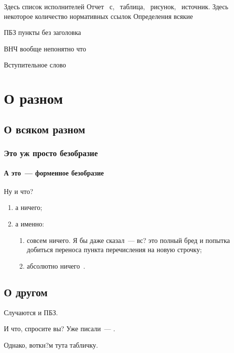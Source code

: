 \documentclass[utf8,usehyperref]{G7-32}
\begin{document}
\frontmatter
 \Executors Здесь список исполнителей
 \Referat
 Отчет \totalpages~с, \totaltables~таблица, \totalfigures~рисунок, \totalbibs~источник.
 \tableofcontents
 \NormRefs Здесь некоторое количество нормативных ссылок
 \Defines Определения всякие
 \Abbreviations
 \begin{abbreviation}
  \item[ПБЗ] пункты без заголовка
  \item[ВНЧ] вообще непонятно что
 \end{abbreviation}

 \Introduction Вступительное слово
\mainmatter

\chapter{О разном}
\ttl
\section{О всяком разном}
\ttl
\subsection{Это уж просто безобразие}
\ttl
\subsubsection{А это~--- форменное безобразие}\label{L1}
Ну и что?
\begin{enumerate}
 \item\label{L1:I1}
  а ничего;
 \item
  а именно:
  \begin{enumerate}
   \item
    совсем ничего. Я бы даже сказал~--- вс? это полный бред
    и попытка добиться переноса пункта перечисления на новую строчку;
   \item
    абсолютно ничего~\cite{bib:test1}.
  \end{enumerate}
\end{enumerate}

\section{О другом}
\nsubsection Случаются и ПБЗ.

И что, спросите вы? Уже писали~--- .

Однако, воткн?м тута табличку.
\end{document}
